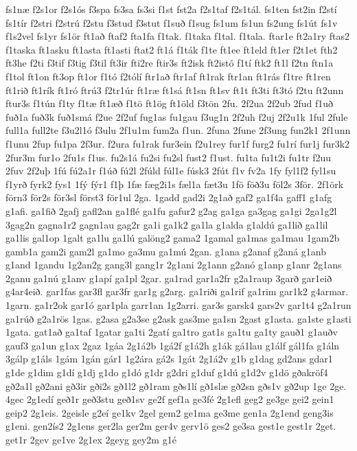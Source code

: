{fs1næ
f2s1or
f2s1ós
f3spa
fs3sa
fs3si
f1st
fst2a
f2s1taf
f2s1tál.
fs1ten
fst2in
f2stí
fs1tír
f2stri
f2strú
f2stu
f3stud
f3stut
f1suð
f1sug
fs1um
fs1un
fs2ung
fs1út
fs1v
f1s2vel
fs1yr
fs1ör
ft1að
ftaf2
fta1fa
f1tak.
f1taka
f1tal.
f1tala.
ftar1e
ft2a1ry
ftas2
f1taska
ft1asku
ft1asta
ft1asti
ftat2
ft1á
f1ták
f1te
ft1ee
ft1eld
ft1er
f2t1et
fth2
ft3he
f2ti
f3tif
f3tig
f3til
ft3ir
fti2re
ftir3s
ft2isk
ft2istó
f1tí
ftk2
ft1l
f2tn
ftn1a
f1tol
ft1on
ft3op
ft1or
f1tó
f2tólí
ftr1að
ftr1af
ft1rak
ftr1an
ft1rás
f1tre
ft1ren
ft1rið
ft1rík
ft1ró
ftrú3
f2tr1úr
ft1ræ
ft1sá
ft1sn
ft1sv
ft1t
ft3ti
ft3tó
f2tu
ft2unn
ftur3s
f1tún
f1ty
f1tæ
ft1æð
f1tö
ft1ög
ft1öld
f3tön
2fu.
2f2ua
2f2ub
2fud
f1uð
fuð1a
fuð3k
fuð1smá
f2ue
2f2uf
fug1as
fu1gau
f3ug1n
2f2uh
f2uj
2f2u1k
1ful
2fule
full1a
full2te
f3u2l1ó
f3ulu
2f1u1m
fum2a
f1un.
2funa
2fune
2f3ung
fun2k1
2f1unn
f1unu
2fup
fu1pa
2f3ur.
f2ura
fu1rak
fur3ein
f2u1rey
fur1f
furg2
fu1rí
fur1j
fur3k2
2fur3m
fur1o
2fu1s
f1us.
fu2s1á
fu2si
fu2sl
fust2
f1ust.
fu1ta
fu1t2i
fu1tr
f2uu
2fuv
2f2uþ
1fú
fú2a1r
f1úð
fú2l
2fúld
fúl1e
fúsk3
2fút
f1v
fv2a
1fy
fyl1f2
fyl1su
f1yrð
fyrk2
fys1
1fý
fýr1
f1þ
1fæ
fæg2i1s
fæl1a
fæt3u
1fö
föð3u
föl2s
3för.
2f1örk
förn3
för2s
för3sl
först3
för1ul
2ga.
1gadd
gad2i
2g1að
gaf2
ga1f4a
gaff1
g1afg
g1afi.
ga1fið
2gafj
gafl2an
ga1flé
ga1fu
gafur2
g2ag
ga1ga
ga3gag
ga1gi
2ga1g2l
3gag2n
gagna1r2
gagn1au
gag2r
ga1i
ga1k2
ga1la
g1alda
g1aldú
ga1lið
ga1lil
ga1lis
gal1op
1galt
ga1lu
ga1lú
galöng2
gama2
1gamal
ga1mas
ga1mau
1gam2b
gamb1a
gam2i
gam2l
ga1mo
ga3mu
ga1mú
2gan.
g1ana
g2anaf
g2aná
g1anb
g1and
1gandu
1g2an2g
gang3l
gang1r
2g1ani
2g1ann
g2anó
g1anp
g1anr
2g1ans
2ganu
ga1nú
g1anv
g1apí
ga1pl
2gar.
ga1rad
gar1a2fr
g2a1raup
3garð
gar1eið
g4ar4eið.
gar1fas
gar3fl
gar3fr
gar1g
g2arg.
ga1riði
ga1rif
ga1rim
gar1k2
g4armar.
1garn.
ga1r2ok
gar1ó
gar1pla
garr1an
1g2arri.
gar3s
garsk4
gars2v
gar1t4
g2a1run
ga1rúð
g2a1rös
1gas.
g2asa
g2a3se
g2ask
gas3me
ga1sn
2gast
g1asta.
ga1ste
g1asti
1gata.
gat1að
ga1taf
1gatar
ga1ti
2gatí
ga1tro
gat1s
ga1tu
ga1ty
gauð1
g1auðv
gauf3
ga1un
g1ax
2gaz
1gáa
2g1á2b
1gá2f
g1á2h
g1ák
gá1lau
g1álf
gál1fa
g1áln
3gálp
g1áls
1gám
1gán
gár1
1g2ára
gá2s
1gát
2g1á2v
g1b
g1dag
gd2ans
gdar1
g1de
g1dim
g1dí
g1dj
g1do
g1dó
g1dr
g2dri
g1duf
g1dú
g1d2v
g1dö
gðakröf4
gð2a1l
gð2ani
gð3ir
gði2s
gð1l2
gð1ram
gðs1lí
gð1slæ
gð2sn
gðs1v
gð2up
1ge
2ge.
4gec
2g1edí
geð1r
geð3stu
geð1sv
ge2f
gef1a
ge3fé
2g1efl
geg2
ge3ge
gei2
gein1
geip2
2g1eis.
2geisle
g2eí
ge1kv
2gel
gem2
ge1ma
ge3me
gen1a
2g1end
geng3is
g1eni.
gen2ís2
2g1ens
ger2la
ger2m
ger4v
gerv1ö
ges2
ge3sa
gest1e
gest1r
2get.
get1r
2gev
ge1ve
2g1ex
2geyg
gey2m
g1é
}
